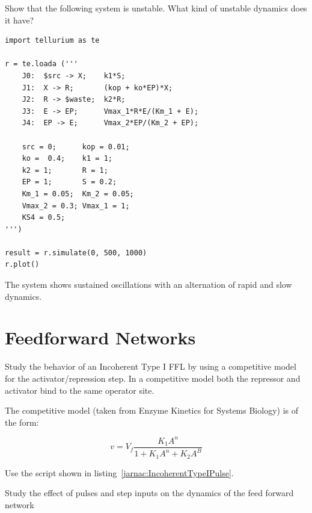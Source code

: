 \documentclass[12pt]{article}
\begin{document}
\cprotEnv\begin{question}
Show that the following system is unstable. What kind of unstable dynamics does it have?

\begin{verbatim}
import tellurium as te

r = te.loada ('''
    J0:  $src -> X;    k1*S;
    J1:  X -> R;       (kop + ko*EP)*X;
    J2:  R -> $waste;  k2*R;
    J3:  E -> EP;      Vmax_1*R*E/(Km_1 + E);
    J4:  EP -> E;      Vmax_2*EP/(Km_2 + EP);

    src = 0;      kop = 0.01;
    ko =  0.4;    k1 = 1;
    k2 = 1;       R = 1;
    EP = 1;       S = 0.2;
    Km_1 = 0.05;  Km_2 = 0.05;
    Vmax_2 = 0.3; Vmax_1 = 1;
    KS4 = 0.5;
''')

result = r.simulate(0, 500, 1000)
r.plot()
\end{verbatim}
\end{question}
\begin{solution}
The system shows sustained oscillations with an alternation of rapid and slow dynamics.
\end{solution}




\section{Feedforward Networks}


\begin{question}
Study the behavior of an Incoherent Type I FFL by using a competitive model for the activator/repression step. In a competitive model both the repressor and activator bind to the same operator site.
\end{question}
\begin{solution}
The competitive model (taken from Enzyme Kinetics for Systems Biology) is of the form:

$$ v = V_f \frac{K_1 A^n}{1 + K_1 A^n + K_2 A^B} $$

Use the script shown in listing~\ref{jarnac:IncoherentTypeIPulse}.

Study the effect of pulses and step inputs on the dynamics of the feed forward network
\end{solution}
\end{document}

